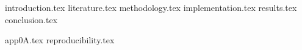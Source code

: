 \documentclass[a4paper,12pt,oneside,openbib,oldfontcommands]{memoir}
\newcommand{\clearemptydoublepage}{\newpage{\thispagestyle{empty}\cleardoublepage}}
\theoremstyle{plain}
\theoremstyle{definition}
\theoremstyle{plain}
\begin{document}
\frontmatter
{}



\clearemptydoublepage


\clearemptydoublepage

\cleardoublepage
{}
\listoftables
\cleardoublepage
{}
\listoffigures
\cleardoublepage

\renewcommand{\contentsname}{Table of Contents}
\tableofcontents
\cleardoublepage

\mainmatter
{introduction.tex}
{literature.tex}
{methodology.tex}
{implementation.tex}
{results.tex}
{conclusion.tex}

\appendix
{app0A.tex}
{reproducibility.tex}

\backmatter


\clearemptydoublepage
\end{document}
